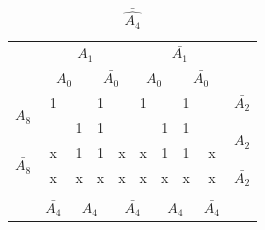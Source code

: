 \documentclass[a4paper,14pt]{article}
\begin{document}
\begin{table}[!htb]
	\begin{minipage}{.5\linewidth}
		\caption{$\hat{A_4}$}
		\centering
		\begin{tabular}{cccccccccc}
			& \multicolumn{4}{c}{$A_1$}                                                                         & \multicolumn{4}{c}{$\bar{A_1}$}                                                                   &                        \\
			& \multicolumn{2}{c}{$A_0$}                       & \multicolumn{2}{c}{$\bar{A_0}$}                 & \multicolumn{2}{c}{$A_0$}                       & \multicolumn{2}{c}{$\bar{A_0}$}                 &                        \\ \cline{2-9}
			\multicolumn{1}{c|}{\multirow{2}{*}{$A_8$}}       & \multicolumn{1}{c|}{1} & \multicolumn{1}{c|}{}  & \multicolumn{1}{c|}{1} & \multicolumn{1}{c|}{}  & \multicolumn{1}{c|}{1} & \multicolumn{1}{c|}{}  & \multicolumn{1}{c|}{1} & \multicolumn{1}{c|}{}  & $\bar{A_2}$            \\ \cline{2-9}
			\multicolumn{1}{c|}{}                             & \multicolumn{1}{c|}{}  & \multicolumn{1}{c|}{1} & \multicolumn{1}{c|}{1} & \multicolumn{1}{c|}{}  & \multicolumn{1}{c|}{}  & \multicolumn{1}{c|}{1} & \multicolumn{1}{c|}{1} & \multicolumn{1}{c|}{}  & \multirow{2}{*}{$A_2$} \\ \cline{2-9}
			\multicolumn{1}{c|}{\multirow{2}{*}{$\bar{A_8}$}} & \multicolumn{1}{c|}{x} & \multicolumn{1}{c|}{1} & \multicolumn{1}{c|}{1} & \multicolumn{1}{c|}{x} & \multicolumn{1}{c|}{x} & \multicolumn{1}{c|}{1} & \multicolumn{1}{c|}{1} & \multicolumn{1}{c|}{x} &                        \\ \cline{2-9}
			\multicolumn{1}{c|}{}                             & \multicolumn{1}{c|}{x} & \multicolumn{1}{c|}{x} & \multicolumn{1}{c|}{x} & \multicolumn{1}{c|}{x} & \multicolumn{1}{c|}{x} & \multicolumn{1}{c|}{x} & \multicolumn{1}{c|}{x} & \multicolumn{1}{c|}{x} & $\bar{A_2}$            \\ \cline{2-9}
			\\
			& $\bar{A_4}$            & \multicolumn{2}{c}{$A_4$}                       & \multicolumn{2}{c}{$\bar{A_4}$}                 & \multicolumn{2}{c}{$A_4$}                       & $\bar{A_4}$            &                       
		\end{tabular}
	\end{minipage}%
	\begin{minipage}{.5\linewidth}
		\centering
		\caption{$\bar{\hat{A_4}}$}

\end{minipage}
\end{table}
\end{document}
